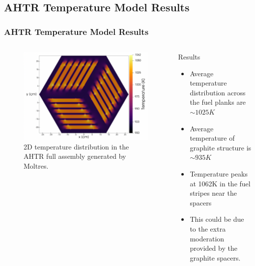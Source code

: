 \subsection{AHTR Temperature Model Results}
\begin{frame}
    \frametitle{AHTR Temperature Model Results}
    \begin{columns}
        \begin{column}{0.6\textwidth}
            \begin{figure}[]
                \centering
                \includegraphics[width=\linewidth]{../docs/figures/benchmark-temperature-model.png} 
                \caption{2D temperature distribution in the \acrfull{AHTR}
                full assembly generated by Moltres.}
            \end{figure}
        \end{column}
        \begin{column}{0.4\textwidth} 
            \begin{block}{Results}
                \begin{itemize}
                    \item Average temperature distribution across the fuel planks are 
                    $\sim 1025K$
                    \item Average temperature of graphite structure is $\sim 935K$
                    \item Temperature peaks at 1062K in the fuel stripes near the spacers
                    \item This could be due to the extra moderation provided by the
                    graphite spacers.
                \end{itemize}
            \end{block}
        \end{column}
        \end{columns}
\end{frame}

